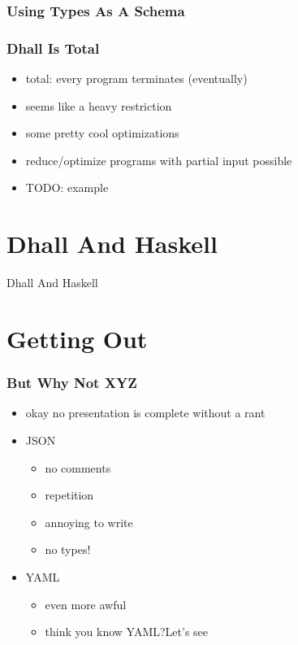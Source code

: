 \documentclass{beamer}
\begin{document}
 \begin{frame}
   \frametitle{Using Types As A Schema}
 \end{frame}

 \begin{frame}
   \frametitle{Dhall Is Total}
   \begin{itemize}
   \item total: every program terminates (eventually)
   \item seems like a heavy restriction
   \item some pretty cool optimizations
   \item reduce/optimize programs with partial input possible
   \item TODO: example
   \end{itemize}
 \end{frame}

 \section{Dhall And Haskell}

 \begin{frame}
   {\Huge Dhall And Haskell}
 \end{frame}

 \section{Getting Out}

 \begin{frame}
   \frametitle{But Why Not XYZ}
   \begin{itemize}
   \item okay no presentation is complete without a rant
   \item JSON
     \begin{itemize}
     \item no comments
     \item repetition
     \item annoying to write
     \item no types!
     \end{itemize}
   \item YAML
     \begin{itemize}
     \item even more awful
     \item think you know YAML?\@ Let's see
     \end{itemize}
   \end{itemize}
 \end{frame}
\end{document}

